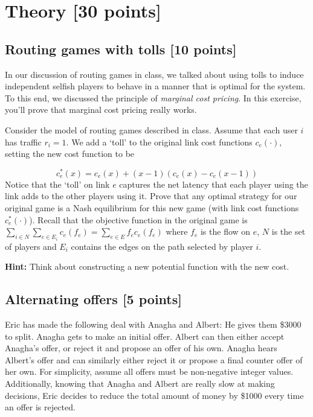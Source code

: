 \documentclass[11pt]{article}
\begin{document}
\newpage
\section{Theory [30 points]}
\vspace{-0.1in}

\subsection{Routing games with tolls [10 points]}

In our discussion of routing games in class, we talked about using tolls to induce independent selfish players to behave in a manner that is optimal for the system. To this end, we discussed the principle of \emph{marginal cost pricing}. In this exercise, you'll prove that marginal cost pricing really works.

Consider the model of routing games described in class. Assume that each user $i$ has traffic $r_i = 1.$ We add a `toll' to the original link cost functions $c_e(\cdot),$ setting the new cost function to be

\vspace{-0.1in}
$$c^*_e(x) = c_e(x) + (x-1)\left(c_e(x) - c_e(x-1)\right)$$
Notice that the `toll' on link $e$ captures the net latency that each player using the link adds to the other players using it.
Prove that any optimal strategy for our original game is a Nash equilibrium for this new game (with link cost functions
$c^*_e(\cdot)$). Recall that the objective function in the original game is $\sum_{i \in N}\sum_{e \in E_i}c_e(f_e)=\sum_{e \in E} f_e c_e(f_e)$ where $f_e$ is the flow on $e$, $N$ is the set of players and $E_i$ contains the edges on the path selected by player $i$.

{\bf Hint: }Think about constructing a new potential function with the new cost.


\subsection{Alternating offers [5 points]}
Eric has made the following deal with Anagha and Albert: He gives them \$3000 to split. Anagha gets to make an initial offer. Albert can then either accept Anagha's offer, or reject it and propose an offer of his own. Anagha hears Albert's offer and can similarly either reject it or propose a final counter offer of her own. For simplicity, assume all offers must be non-negative integer values. 
\noindent Additionally, knowing that Anagha and Albert are really slow at making decisions, Eric decides to reduce the total amount of money by \$1000 every time an offer is rejected.\\
\end{document}

